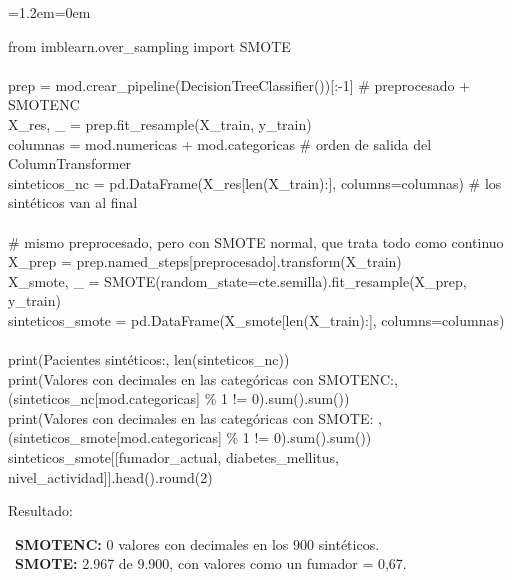 \documentclass[11pt,a4paper]{article}
\newenvironment{codigo}
  {\par\smallskip\begin{list}{}{\leftmargin=1.2em\rightmargin=0em}\item\relax\ttfamily\scriptsize\raggedright}
  {\end{list}\smallskip}
\begin{document}
{\begin{codigo}
from imblearn.over\_\allowbreak{}sampling import SMOTE \\{}
\mbox{} \\{}
prep = mod.crear\_\allowbreak{}pipeline(DecisionTreeClassifier())[:-1]          \# preprocesado + SMOTENC \\{}
X\_\allowbreak{}res, \_\allowbreak{} = prep.fit\_\allowbreak{}resample(X\_\allowbreak{}train, y\_\allowbreak{}train) \\{}
columnas = mod.numericas + mod.categoricas                        \# orden de salida del ColumnTransformer \\{}
sinteticos\_\allowbreak{}nc = pd.DataFrame(X\_\allowbreak{}res[len(X\_\allowbreak{}train):], columns=columnas)   \# los sintéticos van al final \\{}
\mbox{} \\{}
\# mismo preprocesado, pero con SMOTE normal, que trata todo como continuo \\{}
X\_\allowbreak{}prep = prep.named\_\allowbreak{}steps[\textquotedbl{}preprocesado\textquotedbl{}].transform(X\_\allowbreak{}train) \\{}
X\_\allowbreak{}smote, \_\allowbreak{} = SMOTE(random\_\allowbreak{}state=cte.semilla).fit\_\allowbreak{}resample(X\_\allowbreak{}prep, y\_\allowbreak{}train) \\{}
sinteticos\_\allowbreak{}smote = pd.DataFrame(X\_\allowbreak{}smote[len(X\_\allowbreak{}train):], columns=columnas) \\{}
\mbox{} \\{}
print(\textquotedbl{}Pacientes sintéticos:\textquotedbl{}, len(sinteticos\_\allowbreak{}nc)) \\{}
print(\textquotedbl{}Valores con decimales en las categóricas con SMOTENC:\textquotedbl{}, (sinteticos\_\allowbreak{}nc[mod.categoricas] \% 1 != 0).sum().sum()) \\{}
print(\textquotedbl{}Valores con decimales en las categóricas con SMOTE:  \textquotedbl{}, (sinteticos\_\allowbreak{}smote[mod.categoricas] \% 1 != 0).sum().sum()) \\{}
sinteticos\_\allowbreak{}smote[[\textquotedbl{}fumador\_\allowbreak{}actual\textquotedbl{}, \textquotedbl{}diabetes\_\allowbreak{}mellitus\textquotedbl{}, \textquotedbl{}nivel\_\allowbreak{}actividad\textquotedbl{}]].head().round(2)
\end{codigo}
Resultado:

\hspace*{1.0em}\textbullet~\textbf{SMOTENC:} 0 valores con decimales en los 900 sintéticos. \\{}
\hspace*{1.0em}\textbullet~\textbf{SMOTE:} 2.967 de 9.900, con valores como un fumador = 0,67.

}
\end{document}
